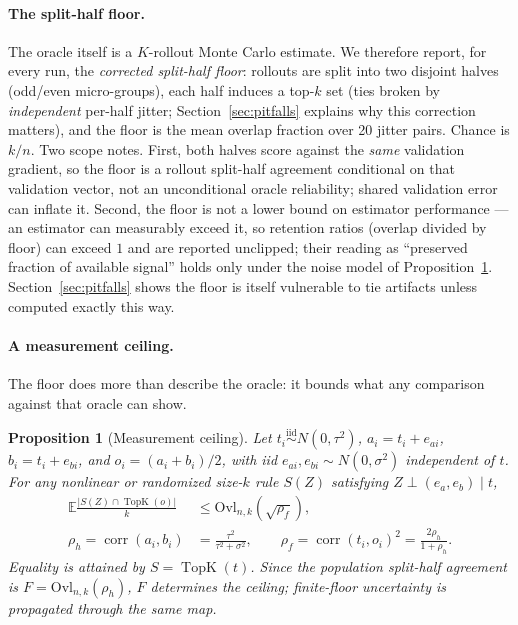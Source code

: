 \documentclass[11pt]{article}
\newtheorem{proposition}{Proposition}
\begin{document}
\paragraph{The split-half floor.} The oracle itself is a $K$-rollout Monte
Carlo estimate. We therefore report, for every run, the \emph{corrected
split-half floor}: rollouts are split into two disjoint halves (odd/even
micro-groups), each half induces a top-$k$ set (ties broken by
\emph{independent} per-half jitter; Section~\ref{sec:pitfalls} explains why
this correction matters), and the floor is the mean overlap fraction over 20
jitter pairs. Chance is $k/n$. Two scope notes. First, both halves score
against the \emph{same} validation gradient, so the floor is a rollout
split-half agreement conditional on that validation vector, not an
unconditional oracle reliability; shared validation error can inflate it.
Second, the floor is not a lower bound on estimator performance --- an
estimator can measurably exceed it, so retention ratios (overlap divided by
floor) can exceed $1$ and are reported unclipped; their reading as
``preserved fraction of available signal'' holds only under the noise model
of Proposition~\ref{prop:ceiling}. Section~\ref{sec:pitfalls} shows the floor
is itself vulnerable to tie artifacts unless computed exactly this way.

\paragraph{A measurement ceiling.} The floor does more than describe the
oracle: it bounds what any comparison against that oracle can show.

\begin{proposition}[Measurement ceiling]
\label{prop:ceiling}
Let $t_i\stackrel{\mathrm{iid}}{\sim}N(0,\tau^2)$,
$a_i=t_i+e_{ai}$, $b_i=t_i+e_{bi}$, and $o_i=(a_i+b_i)/2$, with iid
$e_{ai},e_{bi}\sim N(0,\sigma^2)$ independent of $t$. For any nonlinear or
randomized size-$k$ rule $S(Z)$ satisfying $Z\perp(e_a,e_b)\mid t$,
\begin{align*}
\mathbb E\frac{|S(Z)\cap\operatorname{TopK}(o)|}{k}
&\le \mathrm{Ovl}_{n,k}\!\left(\sqrt{\rho_f}\right),\\
\rho_h=\operatorname{corr}(a_i,b_i)
&=\frac{\tau^2}{\tau^2+\sigma^2},\qquad
\rho_f=\operatorname{corr}(t_i,o_i)^2
=\frac{2\rho_h}{1+\rho_h}.
\end{align*}
Equality is attained by $S=\operatorname{TopK}(t)$. Since the population
split-half agreement is $F=\mathrm{Ovl}_{n,k}(\rho_h)$, $F$ determines the
ceiling; finite-floor uncertainty is propagated through the same map.
\end{proposition}
\end{document}
